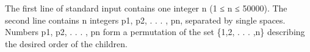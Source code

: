 The first line of standard input contains one integer n (1 ≤ n ≤ 50000). The second line contains n integers p1, p2, . . . , pn, separated by single spaces. Numbers p1, p2, . . . , pn form a permutation of the set \{1,2, . . . ,n\} describing the desired order of the children.